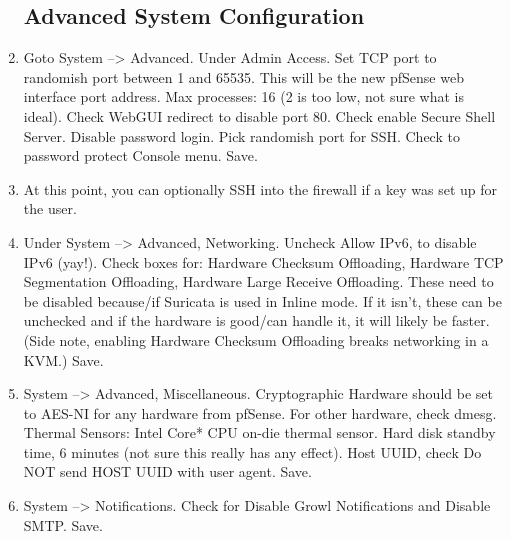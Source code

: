 \begin{enumerate}
\subsection{Advanced System Configuration}
 \item Goto System --> Advanced. Under Admin Access. Set TCP port to randomish port between 1 and 65535. This will be the new pfSense web interface port address. Max processes: 16 (2 is too low, not sure what is ideal). Check WebGUI redirect to disable port 80. Check enable Secure Shell Server. Disable password login. Pick randomish port for SSH. Check to password protect Console menu. Save.
 \item At this point, you can optionally SSH into the firewall if a key was set up for the user.
 \item Under System --> Advanced, Networking. Uncheck Allow IPv6, to disable IPv6 (yay!). Check boxes for: Hardware Checksum Offloading, Hardware TCP Segmentation Offloading, Hardware Large Receive Offloading. These need to be disabled because/if Suricata is used in Inline mode. If it isn't, these can be unchecked and if the hardware is good/can handle it, it will likely be faster. (Side note, enabling Hardware Checksum Offloading breaks networking in a KVM.) Save.
 \item System --> Advanced, Miscellaneous. Cryptographic Hardware should be set to AES-NI for any hardware from pfSense. For other hardware, check dmesg. Thermal Sensors: Intel Core* CPU on-die thermal sensor. Hard disk standby time, 6 minutes (not sure this really has any effect). Host UUID, check Do NOT send HOST UUID with user agent. Save.
 \item System --> Notifications. Check for Disable Growl Notifications and Disable SMTP. Save.
\end{enumerate}

